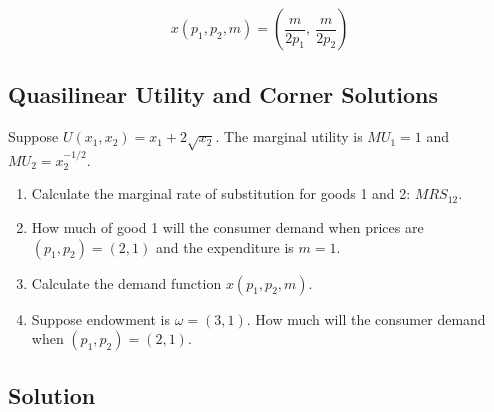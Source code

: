 \documentclass[12pt]{article}
\begin{document}
\[
\boxed{\,x(p_1,p_2,m)=\left(\dfrac{m}{2p_1},\ \dfrac{m}{2p_2}\right)\,}
\]
\newpage
\subsection{Quasilinear Utility and Corner Solutions}

Suppose \(U(x_1,x_2)=x_1+2\sqrt{x_2}\). The marginal utility is \(MU_1=1\) and \(MU_2=x_2^{-1/2}\).
\begin{enumerate}[label=\arabic*., leftmargin=*]
  \item Calculate the marginal rate of substitution for goods 1 and 2: \(MRS_{12}\).
  \item How much of good 1 will the consumer demand when prices are \((p_1,p_2)=(2,1)\) and the expenditure is \(m=1\).
  \item Calculate the demand function \(x(p_1,p_2,m)\).
  \item Suppose endowment is \(\omega=(3,1)\). How much will the consumer demand when \((p_1,p_2)=(2,1)\).
\end{enumerate}

\subsection*{Solution}
\end{document}
